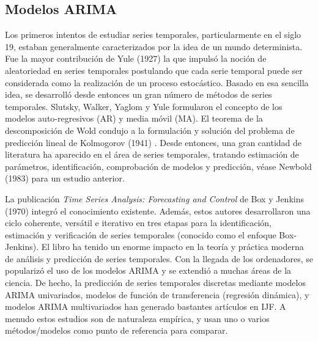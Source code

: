 \documentclass{llncs}
\begin{document}
\subsection{Modelos ARIMA}

Los primeros intentos de estudiar series temporales, particularmente en el siglo 19, estaban generalmente caracterizados por la idea de un mundo determinista. Fue la mayor contribución de Yule (1927) \cite{Yule1927267} la que impulsó la noción de aleatoriedad en series temporales postulando que cada serie temporal puede ser considerada como la realización de un proceso estocástico. Basado en esa sencilla idea, se desarrolló desde entonces un gran número de métodos de series temporales. Slutsky, Walker, Yaglom y Yule formularon el concepto de los modelos auto-regresivos (AR) y media móvil (MA). El teorema de la descomposición de Wold condujo a la formulación y solución del problema de predicción lineal de Kolmogorov (1941) \cite{Kolmogorov19411}. Desde entonces, una gran cantidad de literatura ha aparecido en el área de series temporales, tratando estimación de parámetros, identificación, comprobación de modelos y predicción, véase Newbold (1983) \cite{Newbold198323} para un estudio anterior.

La publicación \emph{Time Series Analysis: Forecasting and Control} de Box y Jenkins (1970) \cite{Box1976} integró el conocimiento existente. Además, estos autores desarrollaron una ciclo coherente, versátil e iterativo en tres etapas para la identificación, estimación y verificación de series temporales (conocido como el enfoque Box-Jenkins). El libro ha tenido un enorme impacto en la teoría y práctica moderna de análisis y predicción de series temporales. Con la llegada de los ordenadores, se popularizó el uso de los modelos ARIMA y se extendió a muchas áreas de la ciencia. De hecho, la predicción de series temporales discretas mediante modelos ARIMA univariados, modelos de función de transferencia (regresión dinámica), y modelos ARIMA multivariados han generado bastantes artículos en IJF. A menudo estos estudios son de naturaleza empírica, y usan uno o varios métodos/modelos como punto de referencia para comparar. 

\begin{table}
\caption{Lista de ejemplos de aplicaciones reales}

\end{table}
\end{document}
